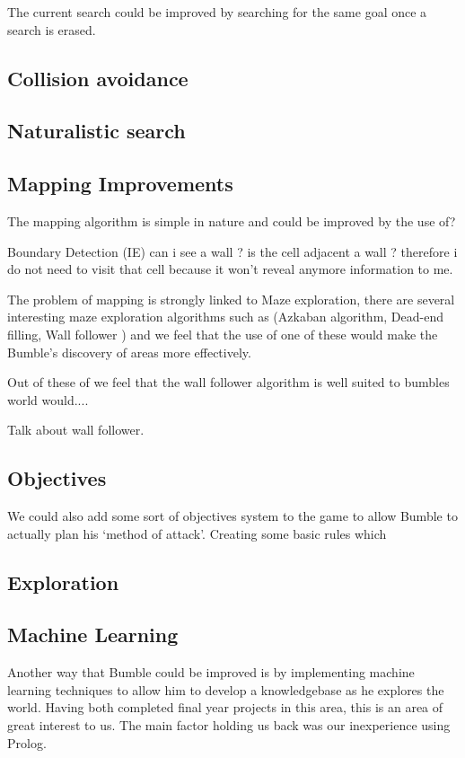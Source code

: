 \documentclass[a4paper,oneside]{report}
\begin{document}
The current search could be improved by searching for the same goal once a search is erased.
				
\subsection{Collision avoidance}
		
\subsection{Naturalistic search} 
		
\subsection{Mapping Improvements}

The mapping algorithm is simple in nature and could be improved by the use of? 
		
Boundary Detection (IE) can i see a wall ? is the cell adjacent a wall ? therefore i do not need to visit that cell because it won't reveal anymore information to me. 
	
The problem of mapping is strongly linked to Maze exploration, there are several interesting maze exploration algorithms such as (Azkaban algorithm, Dead-end filling, Wall follower ) and we feel that the use of one of these would make the Bumble's discovery of areas more effectively. 
	
		Out of these of  we feel that the wall follower algorithm is well suited to bumbles world would.... 
		
		Talk about wall follower.
		
\subsection{Objectives}

We could also add some sort of objectives system to the game to allow Bumble to actually plan his `method of attack'. Creating some basic rules which 

\subsection{Exploration}

\subsection{Machine Learning}

Another way that Bumble could be improved is by implementing machine learning techniques to allow him to develop a knowledgebase as he explores the world. Having both completed final year projects in this area, this is an area of great interest to us. The main factor holding us back was our inexperience using Prolog. 
\end{document}
